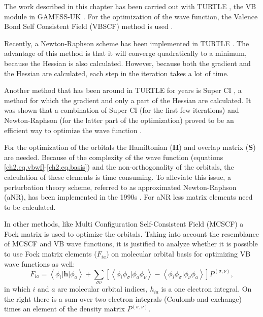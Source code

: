 The work described in this chapter has been carried out with TURTLE \cite{turtle}, the VB module in GAMESS-UK \cite{gamess}. For the optimization of the wave function, the Valence Bond Self Consistent Field (VBSCF) method is used \cite{vbscf1,vbscf2}. 

Recently, a Newton-Raphson scheme has been implemented in TURTLE \cite{zahid}. The advantage of this method is that it will converge quadratically to a minimum, because the Hessian is also calculated. However, because both the gradient and the Hessian are calculated, each step in the iteration takes a lot of time.

Another method that has been around in TURTLE for years is Super CI \cite{superci1,superci2}, a method for which the gradient and only a part of the Hessian are calculated. It was shown that a combination of Super CI (for the first few iterations) and Newton-Raphson (for the latter part of the optimization) proved to be an efficient way to optimize the wave function \cite{zahid}.

For the optimization of the orbitals the Hamiltonian ($\mathbf{H}$) and overlap matrix ($\mathbf{S}$) are needed. Because of the complexity of the wave function (equations \ref{ch2.eq.vbwf}-\ref{ch2.eq.basis}) and the non-orthogonality of the orbitals, the calculation of these elements is time consuming. To alleviate this issue, a perturbation theory scheme, referred to as approximated Newton-Raphson (aNR), has been implemented in the 1990s \cite{koos1}. For aNR less matrix elements need to be calculated.

In other methods, like Multi Configuration Self-Consistent Field (MCSCF) \cite{wahldasbook,daswahl} a Fock matrix is used \cite{roos1,roos2} to optimize the orbitals. Taking into account the resemblance of MCSCF and VB wave functions, it is justified to analyze whether it is possible to use Fock matrix elements ($F_{ia}$) on molecular orbital basis for optimizing VB wave functions as well:
\begin{equation}
F_{ia} = \left< \phi_i | \mathbf{h}| \phi_a \right> + \sum_{\sigma \nu} [ \left <\phi_i \phi_\sigma | \phi_a \phi_\nu \right > - \left < \phi_i \phi_\sigma | \phi_\nu \phi_a \right> ]P^{(\sigma,\nu)},
\label{ch2.eq.fock}
\end{equation}
in which $i$ and $a$ are molecular orbital indices, $h_{ia}$ is a one electron integral. On the right there is a sum over two electron integrals (Coulomb and exchange) times an element of the density matrix $P^{(\sigma,\nu)}$. 

